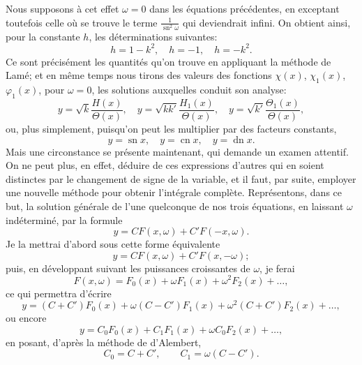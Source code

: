 \documentclass[11pt,leqno,oneside,letterpaper]{book}[2005/09/16]
\DeclareMathOperator{\sn}{sn}
\DeclareMathOperator{\cn}{cn}
\DeclareMathOperator{\dn}{dn}
\begin{document}
Nous supposons \`a cet effet $\omega = 0$ dans les \'equations pr\'ec\'edentes,
en exceptant toutefois celle o\`u se trouve le terme $\frac{1}{\sn^2 \omega}$ qui deviendrait infini.
On obtient ainsi, pour la constante $h$, les d\'eterminations suivantes:
\[
h = 1 - k^2, \quad h = -1, \quad h = -k^2.
\]
Ce sont pr\'ecis\'ement les quantit\'es qu'on trouve en appliquant la m\'ethode de
Lam\'e; et en m\^eme temps nous tirons des valeurs des fonctions $\chi(x)$,
$\chi_1(x)$, $\varphi_1(x)$, pour $\omega = 0$, les solutions auxquelles conduit son analyse:
\[
y = \sqrt{k  } \frac{     H   (x)}{\Theta (x)}, \quad
y = \sqrt{kk'} \frac{     H_1 (x)}{\Theta (x)}, \quad
y = \sqrt{k' } \frac{\Theta_1 (x)}{\Theta (x)},
\]
ou, plus simplement, puisqu'on peut les multiplier par des facteurs constants,
\[
y = \sn x, \quad y = \cn x , \quad  y =\dn x.
\]
Mais une circonstance se pr\'esente maintenant, qui demande un examen
attentif. On ne peut plus, en effet, d\'eduire de ces expressions d'autres
qui en soient distinctes par le changement de signe de la variable, et il
faut, par suite, employer une nouvelle m\'ethode pour obtenir l'int\'egrale
compl\`ete. Repr\'esentons, dans ce but, la solution g\'en\'erale de l'une quelconque
de nos trois \'equations, en laissant $\omega$ ind\'etermin\'e, par la formule
\[
  y = CF(x,\omega) + C'F(-x,\omega).
\]
Je la mettrai d'abord sous cette forme \'equivalente
\[
  y = CF(x,\omega) + C'F(x,-\omega);
\]
puis, en d\'eveloppant suivant les puissances croissantes de $\omega$, je ferai
\[
  F(x,\omega) = F_0(x) + \omega F_1(x) + \omega^2 F_2(x) + \ldots,
\]
ce qui permettra d'\'ecrire
\[
y =         (C + C')F_0(x)
  + \omega  (C - C')F_1(x)
  + \omega^2(C + C')F_2(x) + \ldots,
\]
ou encore
\[
y = C_0F_0(x) + C_1F_1(x) + \omega C_0F_2(x) + \ldots,
\]
en posant, d'apr\`es la m\'ethode de d'Alembert,
\[
C_0 = C + C',\qquad  C_1 = \omega(C - C').
\]
\end{document}
